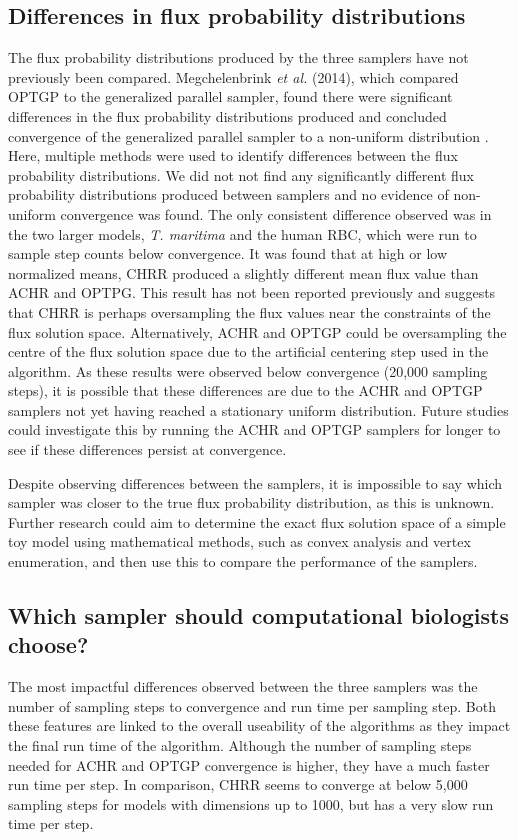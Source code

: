 \documentclass[10pt,letterpaper]{article}
\begin{document}
\subsection*{Differences in flux probability distributions}
The flux probability distributions produced by the three samplers have not previously been compared. Megchelenbrink \textit{et al.} (2014), which compared OPTGP to the generalized parallel sampler, found there were significant differences in the flux probability distributions produced and concluded convergence of the generalized parallel sampler to a non-uniform distribution \cite{Megchelenbrink}. Here, multiple methods were used to identify differences between the flux probability distributions. We did not not find any significantly different flux probability distributions produced between samplers and no evidence of non-uniform convergence was found. The only consistent difference observed was in the two larger models, \textit{T. maritima} and the human RBC, which were run to sample step counts below convergence. It was found that at high or low normalized means, CHRR produced a slightly different mean flux value than ACHR and OPTPG. This result has not been reported previously and suggests that CHRR is perhaps oversampling the flux values near the constraints of the flux solution space. Alternatively, ACHR and OPTGP could be oversampling the centre of the flux solution space due to the artificial centering step used in the algorithm. As these results were observed below convergence (20,000 sampling steps), it is possible that these differences are due to the ACHR and OPTGP samplers not yet having reached a stationary uniform distribution. Future studies could investigate this by running the ACHR and OPTGP samplers for longer to see if these differences persist at convergence. 

Despite observing differences between the samplers, it is impossible to say which sampler was closer to the true flux probability distribution, as this is unknown. Further research could aim to determine the exact flux solution space of a simple toy model using mathematical methods, such as convex analysis and vertex enumeration\cite{Schellenberger}, and then use this to compare the performance of the samplers.

\subsection*{Which sampler should computational biologists choose?}
The most impactful differences observed between the three samplers was the number of sampling steps to convergence and run time per sampling step. Both these features are linked to the overall useability of the algorithms as they impact the final run time of the algorithm. Although the number of sampling steps needed for ACHR and OPTGP convergence is higher, they have a much faster run time per step. In comparison, CHRR seems to converge at below 5,000 sampling steps for models with dimensions up to 1000, but has a very slow run time per step. 
\end{document}
